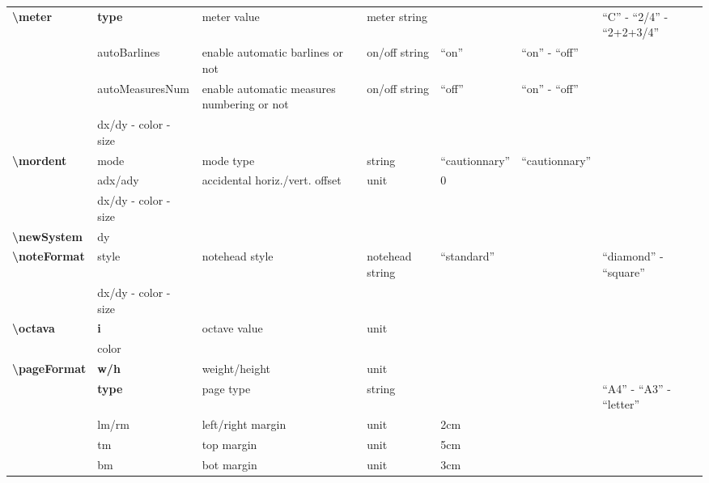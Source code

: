 \documentclass[a4paper, landscape, 10pt]{article}
\begin{document}
\begin{tabularx}{\linewidth}{p{3cm}p{3cm}p{5cm}p{3cm}p{2.5cm}p{3.5cm}p{4cm}}
    \hline
    \textbf{\textbackslash{}meter}&\textbf{type}&meter value&meter string&&&``C'' - ``2/4'' - ``2+2+3/4''\\
    &autoBarlines&enable automatic barlines or not&on/off string&``on''&``on'' - ``off''&\\
    &autoMeasuresNum&enable automatic measures numbering or not&on/off string&``off''&``on'' - ``off''&\\
    &dx/dy - color - size&&&&&\\
    \hline
    \textbf{\textbackslash{}mordent}&mode&mode type&string&``cautionnary''&``cautionnary''&\\
    &adx/ady&accidental horiz./vert. offset&unit&0&&\\
    &dx/dy - color - size&&&&&\\
    \hline
    \textbf{\textbackslash{}newSystem}&dy&&&&&\\
    \hline
    \textbf{\textbackslash{}noteFormat}&style&notehead style&notehead string&``standard''&&``diamond'' - ``square''\\
	&dx/dy - color - size&&&&&\\
    \hline
    \textbf{\textbackslash{}octava}&\textbf{i}&octave value&unit&&&\\
    &color&&&&&\\
    \hline
    \textbf{\textbackslash{}pageFormat}&\textbf{w/h}&weight/height&unit&&&\\
    &\textbf{type}&page type&string&&&``A4'' - ``A3'' - ``letter''\\
    &lm/rm&left/right margin&unit&2cm&&\\
    &tm&top margin&unit&5cm&&\\
    &bm&bot margin&unit&3cm&&\\
    \hline
\end{tabularx}
\end{document}
